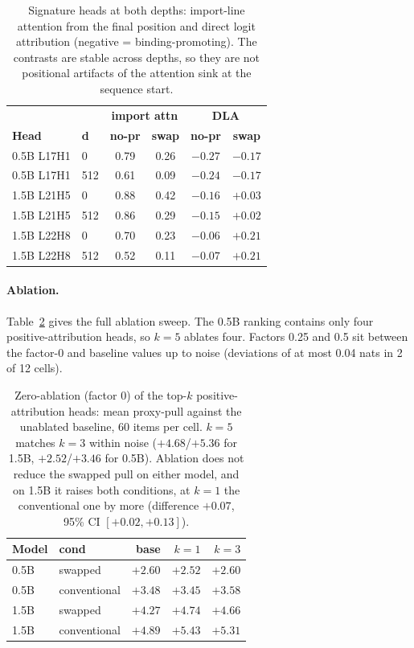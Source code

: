 \documentclass[11pt]{article}
\begin{document}
\begin{table}[t]
\centering
\small
\begin{tabular}{llcccc}
\toprule
& & \multicolumn{2}{c}{\textbf{import attn}} & \multicolumn{2}{c}{\textbf{DLA}} \\
\textbf{Head} & \textbf{d} & \textbf{no-pr} & \textbf{swap} & \textbf{no-pr} & \textbf{swap} \\
\midrule
0.5B L17H1 & 0   & 0.79 & 0.26 & $-0.27$ & $-0.17$ \\
0.5B L17H1 & 512 & 0.61 & 0.09 & $-0.24$ & $-0.17$ \\
1.5B L21H5 & 0   & 0.88 & 0.42 & $-0.16$ & $+0.03$ \\
1.5B L21H5 & 512 & 0.86 & 0.29 & $-0.15$ & $+0.02$ \\
1.5B L22H8 & 0   & 0.70 & 0.23 & $-0.06$ & $+0.21$ \\
1.5B L22H8 & 512 & 0.52 & 0.11 & $-0.07$ & $+0.21$ \\
\bottomrule
\end{tabular}
\caption{Signature heads at both depths: import-line attention from the final position and direct logit attribution (negative = binding-promoting). The contrasts are stable across depths, so they are not positional artifacts of the attention sink at the sequence start.}
\label{tab:headsfull}
\end{table}

\paragraph{Ablation.} Table~\ref{tab:ablate} gives the full ablation sweep. The 0.5B ranking contains only four positive-attribution heads, so $k{=}5$ ablates four. Factors 0.25 and 0.5 sit between the factor-0 and baseline values up to noise (deviations of at most 0.04 nats in 2 of 12 cells).

\begin{table}[t]
\centering
\small
\begin{tabular}{llrrr}
\toprule
\textbf{Model} & \textbf{cond} & \textbf{base} & \textbf{$k{=}1$} & \textbf{$k{=}3$} \\
\midrule
0.5B & swapped      & $+2.60$ & $+2.52$ & $+2.60$ \\
0.5B & conventional & $+3.48$ & $+3.45$ & $+3.58$ \\
1.5B & swapped      & $+4.27$ & $+4.74$ & $+4.66$ \\
1.5B & conventional & $+4.89$ & $+5.43$ & $+5.31$ \\
\bottomrule
\end{tabular}
\caption{Zero-ablation (factor 0) of the top-$k$ positive-attribution heads: mean proxy-pull against the unablated baseline, 60 items per cell. $k{=}5$ matches $k{=}3$ within noise ($+4.68$/$+5.36$ for 1.5B, $+2.52$/$+3.46$ for 0.5B). Ablation does not reduce the swapped pull on either model, and on 1.5B it raises both conditions, at $k{=}1$ the conventional one by more (difference $+0.07$, 95\% CI $[+0.02, +0.13]$).}
\label{tab:ablate}
\end{table}
\end{document}
